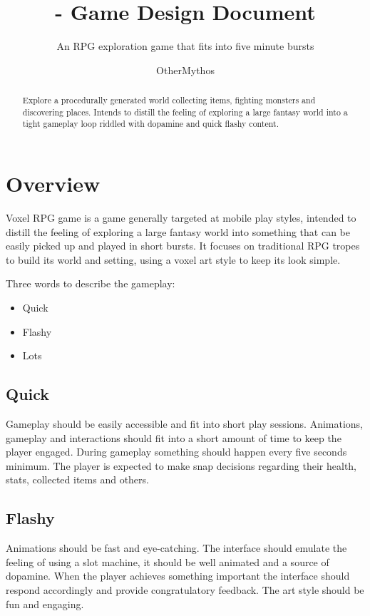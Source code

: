 \documentclass[a4paper]{scrreprt}
\title{\nameofgame{} - Game Design Document}
\subtitle{An RPG exploration game that fits into five minute bursts}
\author{OtherMythos}
\date{\parbox{\linewidth}{\centering%
  \color{red}
  V0.1.0 - Work in progress\endgraf
  
  }}
\newcommand{\nameofgame}{Voxel RPG game}
\begin{document}
\maketitle
\newpage

\begin{abstract}
Explore a procedurally generated world collecting items, fighting monsters and discovering places.
Intends to distill the feeling of exploring a large fantasy world into a tight gameplay loop riddled with dopamine and quick flashy content.
\end{abstract}

\tableofcontents

\chapter{Overview}


\nameofgame{} is a game generally targeted at mobile play styles, intended to distill the feeling of exploring a large fantasy world into something that can be easily picked up and played in short bursts.
It focuses on traditional RPG tropes to build its world and setting, using a voxel art style to keep its look simple.

\vspace{5mm}
Three words to describe the gameplay:

\begin{itemize}
    \item Quick
    \item Flashy
    \item Lots
\end{itemize}

\section{Quick}
Gameplay should be easily accessible and fit into short play sessions.
Animations, gameplay and interactions should fit into a short amount of time to keep the player engaged.
During gameplay something should happen every five seconds minimum.
The player is expected to make snap decisions regarding their health, stats, collected items and others.

\section{Flashy}
Animations should be fast and eye-catching.
The interface should emulate the feeling of using a slot machine, it should be well animated and a source of dopamine.
When the player achieves something important the interface should respond accordingly and provide congratulatory feedback.
The art style should be fun and engaging.
\end{document}
